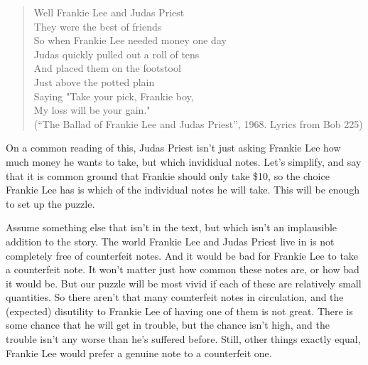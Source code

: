 \documentclass[11pt,]{book}
\begin{document}
\begin{quote}
Well Frankie Lee and Judas Priest\\
They were the best of friends\\
So when Frankie Lee needed money one day\\
Judas quickly pulled out a roll of tens\\
And placed them on the footstool\\
Just above the potted plain\\
Saying "Take your pick, Frankie boy,\\
My loss will be your gain."\\
\hspace*{0.333em}\hspace*{0.333em}\hspace*{0.333em}\hspace*{0.333em}\hspace*{0.333em}\hspace*{0.333em}\hspace*{0.333em}\hspace*{0.333em}\hspace*{0.333em}\hspace*{0.333em}(``The Ballad of Frankie Lee and Judas Priest'', 1968. Lyrics from Bob \citet{Dylan2016} 225)
\end{quote}

On a common reading of this, Judas Priest isn't just asking Frankie Lee how much money he wants to take, but which invididual notes. Let's simplify, and say that it is common ground that Frankie should only take \$10, so the choice Frankie Lee has is which of the individual notes he will take. This will be enough to set up the puzzle.

Assume something else that isn't in the text, but which isn't an implausible addition to the story. The world Frankie Lee and Judas Priest live in is not completely free of counterfeit notes. And it would be bad for Frankie Lee to take a counterfeit note. It won't matter just how common these notes are, or how bad it would be. But our puzzle will be most vivid if each of these are relatively small quantities. So there aren't that many counterfeit notes in circulation, and the (expected) disutility to Frankie Lee of having one of them is not great. There is some chance that he will get in trouble, but the chance isn't high, and the trouble isn't any worse than he's suffered before. Still, other things exactly equal, Frankie Lee would prefer a genuine note to a counterfeit one.
\end{document}
